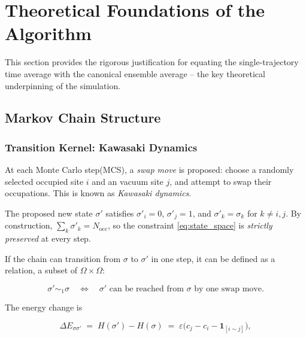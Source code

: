 \documentclass[12pt, a4paper]{article}
\theoremstyle{definition}
\newcommand{\Eeps}{\varepsilon}
\newcommand{\Nocc}{N_\mathrm{occ}}
\begin{document}
\section{Theoretical Foundations of the Algorithm}
\label{sec:theory}

\hfill

This section provides the rigorous justification for equating the
single-trajectory time average with the canonical ensemble average --
the key theoretical underpinning of the simulation.

\subsection{Markov Chain Structure}

\subsubsection{Transition Kernel: Kawasaki Dynamics}

\hfill

At each Monte Carlo step(MCS), a \emph{swap move} is proposed:
choose a randomly selected occupied site $i$ and an vacuum site $j$,
and attempt to swap their occupations.
This is known as \emph{Kawasaki dynamics}.

The proposed new state $\sigma'$ satisfies $\sigma'_i = 0$,
$\sigma'_j = 1$, and $\sigma'_k = \sigma_k$ for $k \neq i, j$.
By construction, $\sum_k \sigma'_k = \Nocc$, so the constraint
\eqref{eq:state_space} is \emph{strictly preserved} at every step.


If the chain can transition from $\sigma$ to $\sigma'$ in one step, it can be defined as a relation, a subset of $\Omega \times \Omega$:

\begin{equation}
    \sigma' \sim_1 \sigma \quad \iff \quad
    \text{$\sigma'$ can be reached from $\sigma$ by one swap move.}
    \label{eq:relation}
\end{equation}

The energy change is

\begin{equation}
    \Delta E_{\sigma \sigma'}
    \;=\; H(\sigma') - H(\sigma)
    \;=\; \Eeps\bigl(c_j - c_i - \mathbf{1}_{[i \sim j]}\bigr),
    \label{eq:delta_E}
\end{equation}
\end{document}
